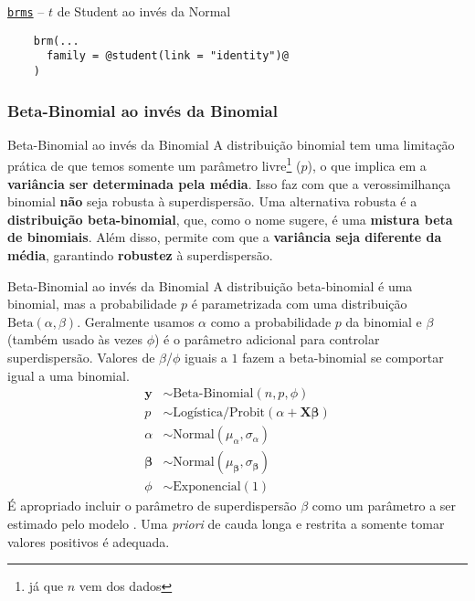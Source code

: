 \begin{frame}[fragile]{\href{https://paul-buerkner.github.io/brms/}{\texttt{brms}} -- $t$ de Student ao invés da Normal}
	\begin{lstlisting}
    brm(...
      family = @student(link = "identity")@
    )
    \end{lstlisting}
\end{frame}

\subsubsection{Beta-Binomial ao invés da Binomial}
\begin{frame}{Beta-Binomial ao invés da Binomial}
	A distribuição binomial tem uma limitação prática de que temos somente um
	parâmetro livre\footnote{já que $n$ vem dos dados} ($p$), o que implica em
	a \textbf{variância ser determinada pela média}. Isso faz com que a verossimilhança
	binomial \textbf{não} seja robusta à superdispersão.
	\vfill
	Uma alternativa robusta é a \textbf{distribuição beta-binomial}, que, como o nome
	sugere, é uma \textbf{mistura beta de binomiais}. Além disso, permite com que
	a \textbf{variância seja diferente da média}, garantindo \textbf{robustez}
	à superdispersão.
\end{frame}

\begin{frame}{Beta-Binomial ao invés da Binomial}
	A distribuição beta-binomial é uma binomial, mas a probabilidade $p$ é parametrizada
	com uma distribuição $\text{Beta}(\alpha, \beta)$. Geralmente usamos $\alpha$ como
	a probabilidade $p$ da binomial e $\beta$ (também usado às vezes $\phi$) é o parâmetro adicional para controlar
	superdispersão. Valores de $\beta$/$\phi$ iguais a $1$ fazem a beta-binomial se comportar
	igual a uma binomial.
	$$
		\begin{aligned}
			\boldsymbol{y}     & \sim \text{Beta-Binomial}(n, p, \phi)                                     \\
			p                  & \sim \text{Logística/Probit}(\alpha +  \mathbf{X} \boldsymbol{\beta})     \\
			\alpha             & \sim \text{Normal}(\mu_\alpha, \sigma_\alpha)                             \\
			\boldsymbol{\beta} & \sim \text{Normal}(\mu_{\boldsymbol{\beta}}, \sigma_{\boldsymbol{\beta}}) \\
			\phi               & \sim \text{Exponencial}(1)
		\end{aligned}
	$$
	\small
	É apropriado incluir o parâmetro de superdispersão $\beta$ como um parâmetro a
	ser estimado pelo modelo \parencite{gelman2013bayesian,mcelreath2020statistical}.
	Uma \textit{priori} de cauda longa e restrita a somente tomar valores positivos é
	adequada.
\end{frame}

